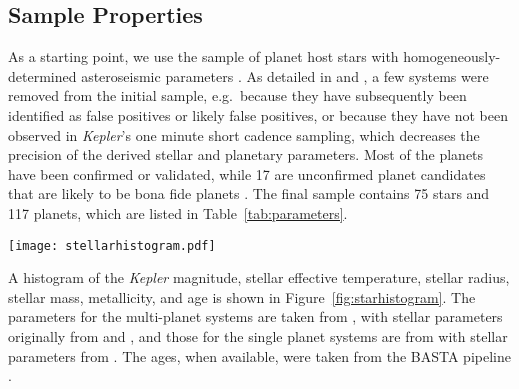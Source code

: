 \documentclass[a4paper,fleqn,usenatbib]{mnras}
\begin{document}
\subsection{Sample Properties}
\label{sec:analysis}

As a starting point, we use the sample of planet host stars with homogeneously-determined asteroseismic parameters \citep{huber2013,silvaaguirre2015,lundkvist2016}. As detailed in \cite{vaneylen2015} and \cite{vaneylen2017}, a few systems were removed from the initial sample, e.g.\ because they have subsequently been identified as false positives or likely false positives, or because they have not been observed in \textit{Kepler}'s one minute short cadence sampling, which decreases the precision of the derived stellar and planetary parameters. Most of the planets have been confirmed or validated, while 17 are unconfirmed planet candidates that are likely to be bona fide planets \citep{morton2016,vaneylen2017}. The final sample contains 75 stars and 117 planets, which are listed in Table~\ref{tab:parameters}. 

\begin{figure*}
	\texttt{[image: stellarhistogram.pdf]}
	\caption{Histograms showing the basic properties of our sample in blue, and the properties of the sample by \protect\cite{fulton2017} in orange. The asteroseismic sample contains brighter stars. The stellar parameter range is similar, but on average this sample contains brighter, larger and older stars. Stars with multiple planets are counted multiple times, but the shape of the histogram is not fundamentally changed if each star is only counted once.}
	\label{fig:starhistogram}
\end{figure*}

A histogram of the \textit{Kepler} magnitude, stellar effective temperature, stellar radius, stellar mass, metallicity, and age is shown in Figure~\ref{fig:starhistogram}. The parameters for the multi-planet systems are taken from \cite{vaneylen2015}, with stellar parameters originally from \cite{huber2013} and \cite{silvaaguirre2015}, and those for the single planet systems are from \cite{vaneylen2017} with stellar parameters from \cite{lundkvist2016}. The ages, when available, were taken from the BASTA pipeline \citep{silvaaguirre2015}.
\end{document}
